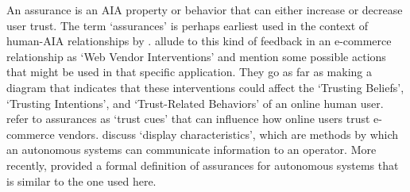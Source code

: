 

    An assurance is an AIA property or behavior that can either increase or decrease user trust. %
    The term `assurances' is perhaps earliest used in the context of human-AIA relationships by \citet{Sheridan1984-kx}. \citet{McKnight2001-fa} allude to this kind of feedback in an e-commerce relationship as `Web Vendor Interventions' and mention some possible actions that might be used in that specific application. They go as far as making a diagram that indicates that these interventions could affect the `Trusting Beliefs', `Trusting Intentions', and `Trust-Related Behaviors' %
    of an online human user. \citet{Corritore2003-gx} refer to assurances as `trust cues' that can influence how online users trust e-commerce vendors. \citet{Lee2004-pv} discuss `display characteristics', which are methods by which an autonomous systems can communicate information to an operator. More recently, \citet{Lillard2016-yg} provided a formal definition of assurances for autonomous systems that is similar to the one used here. %

